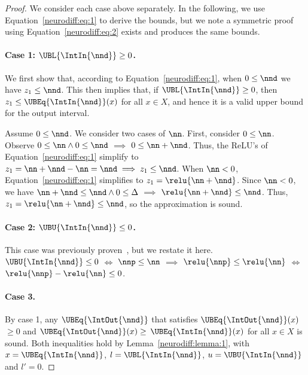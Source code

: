 \begin{proof}

We consider each case above separately. In the following, we use
Equation~\ref{neurodiff:eq:1} to derive the bounds, but we note a symmetric proof
using
Equation~\ref{neurodiff:eq:2} exists and produces the same bounds.

\paragraph{Case 1: $ \UBL{\IntIn{\nnd}} \geq 0 $.}
We first show that, according to Equation~\ref{neurodiff:eq:1}, when $ 0 \leq
\nnd $ we have $ z_1 \leq \nnd $. This then implies that, if
$ \UBL{\IntIn{\nnd}} \geq 0 $, then $ z_1 \leq \UBEq{\IntIn{\nnd}}(x)
$ for all $ x \in X $, and hence it is a valid upper bound for the output
interval.

Assume $ 0 \leq \nnd $. We consider two cases of $ \nn $. First, consider
$ 0 \leq \nn $. Observe $ 0 \leq \nn \wedge 0 \leq \nnd $ $ \implies $
$ 0 \leq \nn + \nnd $. Thus, the ReLU's of Equation~\ref{neurodiff:eq:1}
simplify to $ z_1 = \nn + \nnd - \nn = \nnd \implies z_1 \leq \nnd
$. When $ \nn < 0 $, Equation~\ref{neurodiff:eq:1} simplifies to $ z_1
= \relu{\nn + \nnd} $. Since $ \nn < 0 $, we have $ \nn
+ \nnd \leq \nnd \wedge 0 \leq \Delta $ $ \implies $ $ \relu{\nn + \nnd}
\leq \nnd$. Thus,
$ z_1 = \relu{\nn + \nnd} \leq \nnd $, so the approximation is
sound.

\paragraph{Case 2: $ \UBU{\IntIn{\nnd}} \leq 0 $.}
This case was previously proven~\cite{PaulsenWW20}, but we restate it
here.  $ \UBU{\IntIn{\nnd}} \leq 0 $ $ \iff $ $ \nnp \leq \nn $ $ \implies $
$\relu{\nnp} \leq \relu{\nn} $
$ \iff $ $ \relu{\nnp} - \relu{\nn} \leq 0 $.

\paragraph{Case 3.}
By case 1, any $ \UBEq{\IntOut{\nnd}} $ that satisfies
$ \UBEq{\IntOut{\nnd}}(x) $ $ \geq 0 $ and $ \UBEq{\IntOut{\nnd}}(x) \geq
$ $ \UBEq{\IntIn{\nnd}}(x) $ for all $ x \in X $ is sound. Both
inequalities hold by Lemma~\ref{neurodiff:lemma:1}, with $ x
= \UBEq{\IntIn{\nnd}} $, $l=\UBL{\IntIn{\nnd}}$,
$u=\UBU{\IntIn{\nnd}}$ and $ l' = 0 $.

\end{proof}



